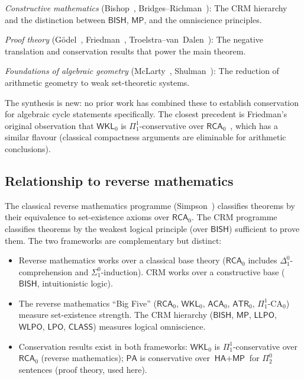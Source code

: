 \documentclass[11pt,a4paper]{article}
\theoremstyle{plain}
\theoremstyle{definition}
\newcommand{\BISH}{\textsf{BISH}}
\newcommand{\WKL}{\textsf{WKL}}
\newcommand{\WLPO}{\textsf{WLPO}}
\newcommand{\LLPO}{\textsf{LLPO}}
\newcommand{\LPO}{\textsf{LPO}}
\newcommand{\MP}{\textsf{MP}}
\newcommand{\CLASS}{\textsf{CLASS}}
\newcommand{\HA}{\textsf{HA}}
\newcommand{\PA}{\textsf{PA}}
\begin{document}
\emph{Constructive mathematics} (Bishop~\cite{bishop1967}, Bridges--Richman~\cite{bridges-richman1987}): The CRM hierarchy and the distinction between $\BISH$, $\MP$, and the omniscience principles.

\emph{Proof theory} (G\"odel~\cite{godel1933}, Friedman~\cite{friedman1977,friedman1978}, Troelstra--van~Dalen~\cite{troelstra-vandalen1988}): The negative translation and conservation results that power the main theorem.

\emph{Foundations of algebraic geometry} (McLarty~\cite{mclarty2010}, Shulman~\cite{shulman2010}): The reduction of arithmetic geometry to weak set-theoretic systems.

The synthesis is new: no prior work has combined these to establish conservation for algebraic cycle statements specifically.  The closest precedent is Friedman's original observation that $\WKL_0$ is $\Pi^1_1$-conservative over $\textsf{RCA}_0$~\cite{friedman1977,simpson2009}, which has a similar flavour (classical compactness arguments are eliminable for arithmetic conclusions).

\subsection{Relationship to reverse mathematics}

The classical reverse mathematics programme (Simpson~\cite{simpson2009}) classifies theorems by their equivalence to set-existence axioms over $\textsf{RCA}_0$.  The CRM programme classifies theorems by the weakest logical principle (over $\BISH$) sufficient to prove them.  The two frameworks are complementary but distinct:

\begin{itemize}[nosep]
\item Reverse mathematics works over a classical base theory ($\textsf{RCA}_0$ includes $\Delta^0_1$-comprehension and $\Sigma^0_1$-induction).  CRM works over a constructive base ($\BISH$, intuitionistic logic).
\item The reverse mathematics ``Big Five'' ($\textsf{RCA}_0$, $\WKL_0$, $\textsf{ACA}_0$, $\textsf{ATR}_0$, $\Pi^1_1\text{-CA}_0$) measure set-existence strength.  The CRM hierarchy ($\BISH$, $\MP$, $\LLPO$, $\WLPO$, $\LPO$, $\CLASS$) measures logical omniscience.
\item Conservation results exist in both frameworks: $\WKL_0$ is $\Pi^1_1$-conservative over $\textsf{RCA}_0$ (reverse mathematics); $\PA$ is conservative over $\HA + \MP$ for $\Pi^0_2$ sentences (proof theory, used here).
\end{itemize}
\end{document}
